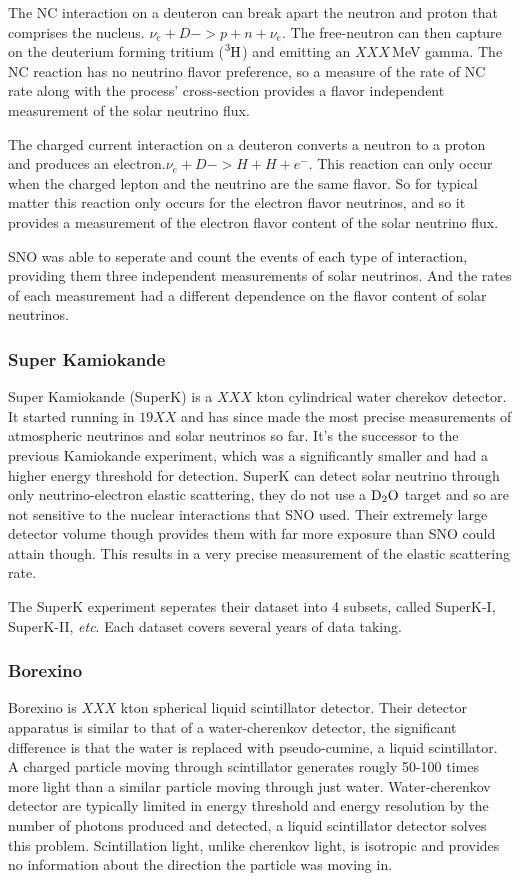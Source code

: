 The NC interaction on a deuteron can break apart the neutron and proton
that comprises the nucleus. $\nu_{e} + D -> p + n + \nu_{e}$.
The free-neutron can then capture on the deuterium forming tritium ($\ce{^{3}H}$)
and emitting an $XXX$\,MeV gamma. %
The NC reaction has no neutrino flavor preference, so a measure of the rate
of NC rate along with the process' cross-section provides a flavor independent
measurement of the solar neutrino flux.

The charged current interaction on a deuteron converts a neutron to a
proton and produces an electron.$\nu_{e} + D -> H + H + e^{-}$.
This reaction can only occur when the charged lepton and the neutrino are the same
flavor. So for typical matter this reaction only occurs for the electron flavor
neutrinos, and so it provides a measurement of the electron flavor content
of the solar neutrino flux.

SNO was able to seperate and count the events of each type of interaction,
providing them three independent measurements of solar neutrinos. And
the rates of each measurement had a different dependence on the flavor content
of solar neutrinos.


\subsubsection{Super Kamiokande}
Super Kamiokande (SuperK) is a $XXX$ kton cylindrical water cherekov detector.
It started running in $19XX$ and has since made the most precise measurements of
atmospheric neutrinos and solar neutrinos so far.
It's the successor to the previous Kamiokande experiment, which was a significantly
smaller and had a higher energy threshold for detection.
SuperK can detect solar neutrino through only neutrino-electron elastic scattering,
they do not use a $\ce{D_{2}O}$ target and so are not sensitive to the
nuclear interactions that SNO used.
Their extremely large detector volume though provides them with far more exposure
than SNO could attain though. This results in a very precise measurement of the
elastic scattering rate.

The SuperK experiment seperates their dataset into 4 subsets, called
SuperK-I, SuperK-II, \textit{etc}. %
Each dataset covers several years of data taking.

\subsubsection{Borexino}
Borexino is $XXX$ kton spherical liquid scintillator detector. Their detector
apparatus is similar to that of a water-cherenkov detector, the significant difference
is that the water is replaced with pseudo-cumine, a liquid scintillator.
A charged particle moving through scintillator generates rougly 50-100 times
more light than a similar particle moving through just water.
Water-cherenkov detector are typically limited in energy threshold
and energy resolution by the number of photons produced and detected, a liquid scintillator
detector solves this problem.  Scintillation light, unlike cherenkov light,
is isotropic and provides no information about the direction the particle
was moving in.

